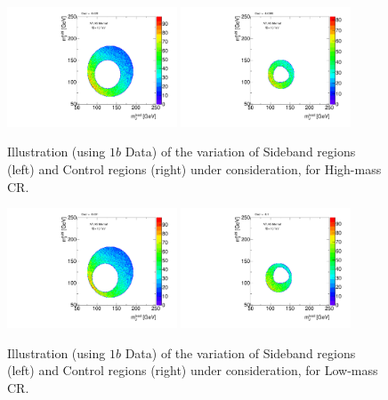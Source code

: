 \begin{figure}[htbp!]
\begin{center}
\includegraphics[width=0.45\textwidth,angle=-90]{figures/boosted/Syst_CRSB/CR_High_Sideband_OneTag_mH0H1.pdf}
\includegraphics[width=0.45\textwidth,angle=-90]{figures/boosted/Syst_CRSB/CR_High_Control_OneTag_mH0H1.pdf}\\
\end{center}
\caption{Illustration (using $1b$ Data) of the variation of Sideband regions (left) and Control regions (right) under consideration, for High-mass CR.}
\label{CRSB:CR_High}
\end{figure}

\begin{figure}[htbp!]
\begin{center}
\includegraphics[width=0.45\textwidth,angle=-90]{figures/boosted/Syst_CRSB/CR_Low_Sideband_OneTag_mH0H1.pdf}
\includegraphics[width=0.45\textwidth,angle=-90]{figures/boosted/Syst_CRSB/CR_Low_Control_OneTag_mH0H1.pdf}\\
\end{center}
\caption{Illustration (using $1b$ Data) of the variation of Sideband regions (left) and Control regions (right) under consideration, for Low-mass CR.}
\label{CRSB:CR_Low}
\end{figure}

